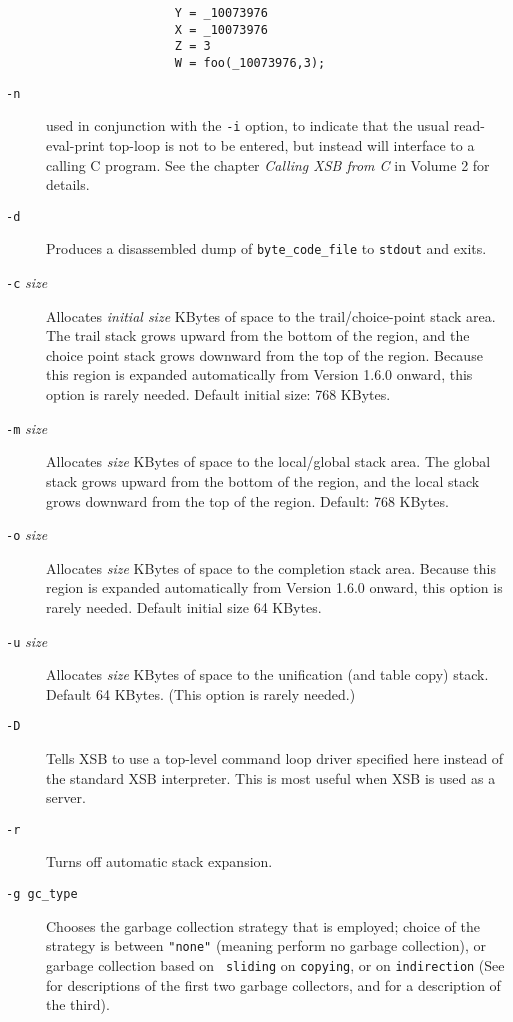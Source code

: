 \begin{description}
\begin{verbatim}
                  Y = _10073976
                  X = _10073976
                  Z = 3
                  W = foo(_10073976,3);
	\end{verbatim}
\item[{\tt -n}] used in conjunction with the {\tt -i} option, to
    indicate that the usual read-eval-print top-loop is not to be
    entered, but instead will interface to a calling C program.  See
    the chapter {\it Calling XSB from C} in Volume 2  for details.
\item[{\tt -d}] Produces a disassembled dump of {\tt byte\_code\_file} to 
    {\tt stdout} and exits.
\item[{\tt -c} {\em size}] Allocates {\em initial  size\/} KBytes of space
    to the trail/choice-point stack area.  The trail stack grows
    upward from the bottom of the region, and the choice point stack
    grows downward from the top of the region.  Because this region is
    expanded automatically from Version 1.6.0 onward, this option
    is rarely needed.  Default initial size: 768 KBytes.
\item[{\tt -m} {\em size}] Allocates {\em size\/} KBytes
    of space to the local/global stack area.  The global stack grows 
    upward from the bottom of the region, and the local stack grows 
    downward from the top of the region.  Default: 768 KBytes.
\item[{\tt -o} {\em size}] Allocates {\em size\/} KBytes of space
    to the completion stack area.  Because this region is expanded
    automatically from Version 1.6.0 onward, this option is rarely
    needed. Default initial size 64 KBytes.
\item[{\tt -u} {\em size}] Allocates {\em size} KBytes of space
    to the unification (and table copy) stack.  Default 64 KBytes.
    (This option is rarely needed.)
\item[{\tt -D}] Tells XSB to use a top-level command loop driver specified
  here instead of the standard XSB interpreter. This is most useful when
  XSB is used as a server.
\item[{\tt -r}] Turns off automatic stack expansion.
%
\item[{\tt -g gc\_type}] Chooses the garbage collection strategy that
is employed; choice of the strategy is between {\tt "none"} (meaning
perform no garbage collection), or garbage collection based on {\tt
sliding} on {\tt copying}, or on {\tt indirection} (See
\cite{CATmem@ISMM-98} for descriptions of the first two garbage
collectors, and \cite{CaSC01} for a description of the third).  

\end{description}
